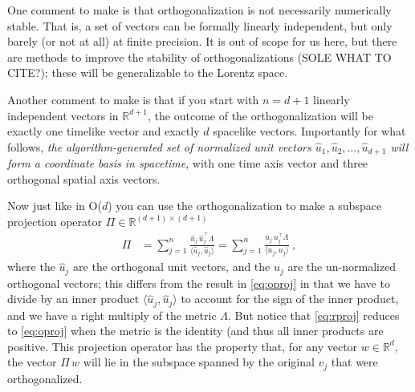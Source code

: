 \documentclass{article}
\newcommand{\inner}[2]{\langle{#1},{#2}\rangle}
\begin{document}
One comment to make is that orthogonalization is not necessarily numerically stable.
That is, a set of vectors can be formally linearly independent, but only barely (or not at all) at finite precision.
It is out of scope for us here, but there are methods to improve the stability of orthogonalizations (SOLE WHAT TO CITE?); these will be generalizable to the Lorentz space.

Another comment to make is that if you start with $n=d+1$ linearly independent vectors in $\mathbb{R}^{d+1}$, the outcome of the orthogonalization will be exactly one timelike vector and exactly $d$ spacelike vectors.
Importantly for what follows, \emph{the algorithm-generated set of normalized unit vectors $\hat{u}_1,\hat{u}_2,\ldots,\hat{u}_{d+1}$ will form a coordinate basis in spacetime}, with one time axis vector and three orthogonal spatial axis vectors.

Now just like in O($d$) you can use the orthogonalization to make a subspace projection operator $\Pi\in\mathbb{R}^{(d+1)\times(d+1)}$
\begin{align}\label{eq:rproj}
    \Pi &= \sum_{j=1}^n \frac{\hat{u}_j\,\hat{u}_j^\top\Lambda}{\inner{\hat{u}_j}{\hat{u}_j}} = \sum_{j=1}^n \frac{u_j\,u_j^\top\Lambda}{\inner{u_j}{u_j}} ~,
\end{align}
where the $\hat{u}_j$ are the orthogonal unit vectors, and the $u_j$ are the un-normalized orthogonal vectors; this differs from the result in \eqref{eq:oproj} in that we have to divide by an inner product $\inner{\hat{u}_j}{\hat{u}_j}$ to account for the sign of the inner product, and we have a right multiply of the metric $\Lambda$.
But notice that \eqref{eq:rproj} reduces to \eqref{eq:oproj} when the metric is the identity (and thus all inner products are positive.
This projection operator has the property that, for any vector $w\in\mathbb{R}^d$, the vector $\Pi\,w$ will lie in the subspace spanned by the original $v_j$ that were orthogonalized.
\end{document}
